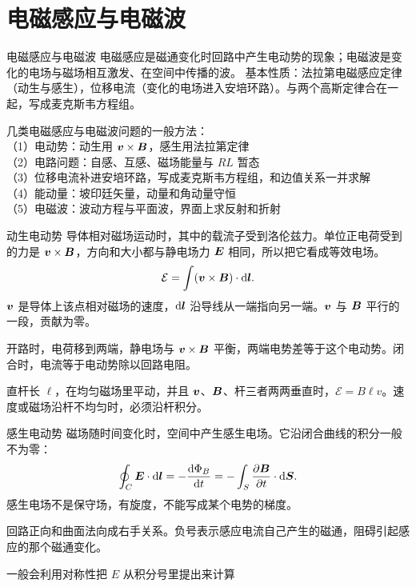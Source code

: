 \section{电磁感应与电磁波}
\gdef\coursepart{电磁感应与电磁波}

\begin{frame}{电磁感应与电磁波}
电磁感应是磁通变化时回路中产生电动势的现象；电磁波是变化的电场与磁场相互激发、在空间中传播的波。
基本性质：法拉第电磁感应定律（动生与感生），位移电流（变化的电场进入安培环路）。与两个高斯定律合在一起，写成麦克斯韦方程组。

几类电磁感应与电磁波问题的一般方法：\\
（1）电动势：动生用 $\bm{v}\times\bm{B}$，感生用法拉第定律\\
（2）电路问题：自感、互感、磁场能量与 $RL$ 暂态\\
（3）位移电流补进安培环路，写成麦克斯韦方程组，和边值关系一并求解\\
（4）能动量：坡印廷矢量，动量和角动量守恒\\
（5）电磁波：波动方程与平面波，界面上求反射和折射
\end{frame}

\begin{frame}{动生电动势}
导体相对磁场运动时，其中的载流子受到洛伦兹力。单位正电荷受到的力是 $\bm{v}\times\bm{B}$，方向和大小都与静电场力 $\bm{E}$ 相同，所以把它看成等效电场。
\[
 \mathcal{E}=\int(\bm{v}\times\bm{B})\cdot\mathop{}\!\mathrm d\bm{l}.
\]
$\bm{v}$ 是导体上该点相对磁场的速度，$\mathop{}\!\mathrm d\bm{l}$ 沿导线从一端指向另一端。$\bm{v}$ 与 $\bm{B}$ 平行的一段，贡献为零。

开路时，电荷移到两端，静电场与 $\bm{v}\times\bm{B}$ 平衡，两端电势差等于这个电动势。闭合时，电流等于电动势除以回路电阻。

直杆长 $\ell$，在均匀磁场里平动，并且 $\bm{v}$、$\bm{B}$、杆三者两两垂直时，$\mathcal{E}=B\ell v$。速度或磁场沿杆不均匀时，必须沿杆积分。
\end{frame}

\begin{frame}{感生电动势}
磁场随时间变化时，空间中产生感生电场。它沿闭合曲线的积分一般不为零：
\[
 \oint_C\bm{E}\cdot\mathop{}\!\mathrm d\bm{l}
 =-\frac{\mathop{}\!\mathrm d\Phi_B}{\mathop{}\!\mathrm d t}
 =-\int_S\frac{\partial\bm{B}}{\partial t}\cdot\mathop{}\!\mathrm d\bm{S}.
\]
感生电场不是保守场，有旋度，不能写成某个电势的梯度。

回路正向和曲面法向成右手关系。负号表示感应电流自己产生的磁通，阻碍引起感应的那个磁通变化。

一般会利用对称性把 $E$ 从积分号里提出来计算
\end{frame}

